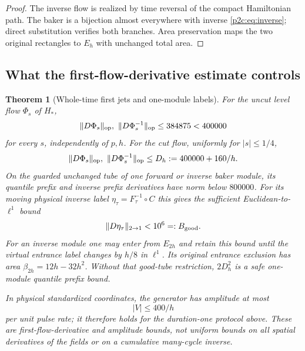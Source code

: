 \documentclass[11pt]{article}
\numberwithin{equation}{section}
\newtheorem{theorem}{Theorem}[section]
\theoremstyle{definition}
\theoremstyle{remark}
\begin{document}
\begin{proof}
The inverse flow is realized by time reversal of the compact
Hamiltonian path. The baker is a bijection almost everywhere
with inverse \eqref{p2c:eq:inverse}; direct substitution verifies
both branches. Area preservation maps the two original
rectangles to $E_h$ with unchanged total area.
\end{proof}

\subsection{What the first-flow-derivative estimate controls}

\begin{theorem}[Whole-time first jets and one-module labels]
\label{p2c:thm:jets}
For the uncut level flow $\Phi_s$ of $H_*$,
\begin{equation}\label{p2c:eq:uncutjets}
 \|D\Phi_s\|_{\rm op},\ \|D\Phi_s^{-1}\|_{\rm op}
 \leq384875<400000
\end{equation}
for every $s$, independently of $p,h$. For the cut flow,
uniformly for $|s|\leq1/4$,
\begin{equation}\label{p2c:eq:cutjets}
 \|D\Phi_s\|_{\rm op},\ \|D\Phi_s^{-1}\|_{\rm op}
 \leq D_h:=400000+160/h.
\end{equation}
On the guarded unchanged tube of one forward or inverse baker
module, its quantile prefix and inverse prefix derivatives
have norm below $800000$. For its moving physical inverse
label $\eta_\tau=F_\tau^{-1}\circ C$ this gives the sufficient
Euclidean-to-$\ell^1$ bound
\begin{equation}\label{p2c:eq:goodlabel}
 \|D\eta_\tau\|_{2\to1}<10^6=:B_{\rm good}.
\end{equation}
For an inverse module one may enter from $E_{2h}$ and retain
this bound until the virtual entrance label changes by $h/8$
in $\ell^1$. Its original entrance exclusion has area
$\beta_{2h}=12h-32h^2$. Without that good-tube restriction,
$2D_h^2$ is a safe one-module quantile prefix bound.

In physical standardized coordinates, the generator has
amplitude at most
\begin{equation}\label{p2c:eq:amplitude}
 |V|\leq400/h
\end{equation}
per unit pulse rate; it therefore holds for the duration-one
protocol above. These are first-flow-derivative and amplitude
bounds, not uniform bounds on all spatial derivatives of the
fields or on a cumulative many-cycle inverse.
\end{theorem}
\end{document}
